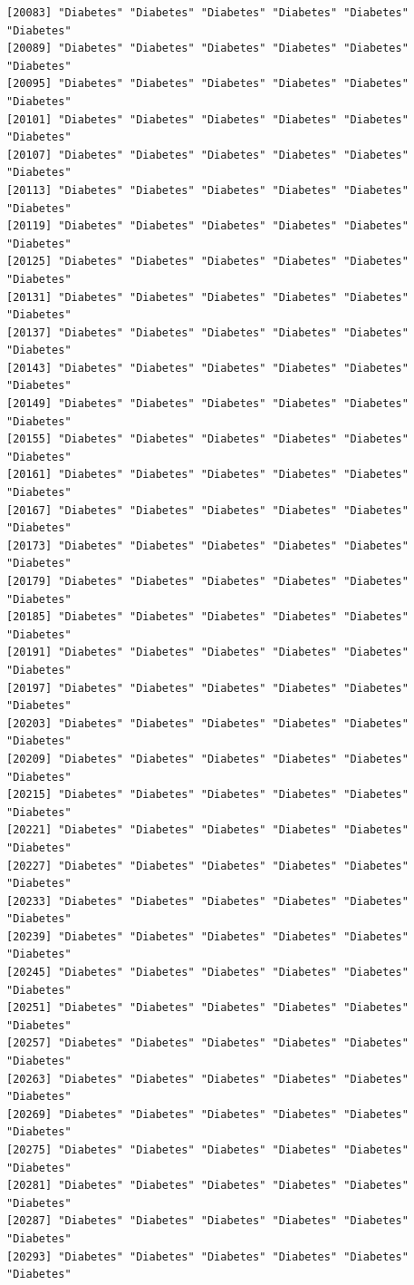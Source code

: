 \documentclass[
  letterpaper,
  DIV=11,
  numbers=noendperiod]{scrartcl}
\begin{document}
\begin{verbatim}
[20083] "Diabetes" "Diabetes" "Diabetes" "Diabetes" "Diabetes" "Diabetes"
[20089] "Diabetes" "Diabetes" "Diabetes" "Diabetes" "Diabetes" "Diabetes"
[20095] "Diabetes" "Diabetes" "Diabetes" "Diabetes" "Diabetes" "Diabetes"
[20101] "Diabetes" "Diabetes" "Diabetes" "Diabetes" "Diabetes" "Diabetes"
[20107] "Diabetes" "Diabetes" "Diabetes" "Diabetes" "Diabetes" "Diabetes"
[20113] "Diabetes" "Diabetes" "Diabetes" "Diabetes" "Diabetes" "Diabetes"
[20119] "Diabetes" "Diabetes" "Diabetes" "Diabetes" "Diabetes" "Diabetes"
[20125] "Diabetes" "Diabetes" "Diabetes" "Diabetes" "Diabetes" "Diabetes"
[20131] "Diabetes" "Diabetes" "Diabetes" "Diabetes" "Diabetes" "Diabetes"
[20137] "Diabetes" "Diabetes" "Diabetes" "Diabetes" "Diabetes" "Diabetes"
[20143] "Diabetes" "Diabetes" "Diabetes" "Diabetes" "Diabetes" "Diabetes"
[20149] "Diabetes" "Diabetes" "Diabetes" "Diabetes" "Diabetes" "Diabetes"
[20155] "Diabetes" "Diabetes" "Diabetes" "Diabetes" "Diabetes" "Diabetes"
[20161] "Diabetes" "Diabetes" "Diabetes" "Diabetes" "Diabetes" "Diabetes"
[20167] "Diabetes" "Diabetes" "Diabetes" "Diabetes" "Diabetes" "Diabetes"
[20173] "Diabetes" "Diabetes" "Diabetes" "Diabetes" "Diabetes" "Diabetes"
[20179] "Diabetes" "Diabetes" "Diabetes" "Diabetes" "Diabetes" "Diabetes"
[20185] "Diabetes" "Diabetes" "Diabetes" "Diabetes" "Diabetes" "Diabetes"
[20191] "Diabetes" "Diabetes" "Diabetes" "Diabetes" "Diabetes" "Diabetes"
[20197] "Diabetes" "Diabetes" "Diabetes" "Diabetes" "Diabetes" "Diabetes"
[20203] "Diabetes" "Diabetes" "Diabetes" "Diabetes" "Diabetes" "Diabetes"
[20209] "Diabetes" "Diabetes" "Diabetes" "Diabetes" "Diabetes" "Diabetes"
[20215] "Diabetes" "Diabetes" "Diabetes" "Diabetes" "Diabetes" "Diabetes"
[20221] "Diabetes" "Diabetes" "Diabetes" "Diabetes" "Diabetes" "Diabetes"
[20227] "Diabetes" "Diabetes" "Diabetes" "Diabetes" "Diabetes" "Diabetes"
[20233] "Diabetes" "Diabetes" "Diabetes" "Diabetes" "Diabetes" "Diabetes"
[20239] "Diabetes" "Diabetes" "Diabetes" "Diabetes" "Diabetes" "Diabetes"
[20245] "Diabetes" "Diabetes" "Diabetes" "Diabetes" "Diabetes" "Diabetes"
[20251] "Diabetes" "Diabetes" "Diabetes" "Diabetes" "Diabetes" "Diabetes"
[20257] "Diabetes" "Diabetes" "Diabetes" "Diabetes" "Diabetes" "Diabetes"
[20263] "Diabetes" "Diabetes" "Diabetes" "Diabetes" "Diabetes" "Diabetes"
[20269] "Diabetes" "Diabetes" "Diabetes" "Diabetes" "Diabetes" "Diabetes"
[20275] "Diabetes" "Diabetes" "Diabetes" "Diabetes" "Diabetes" "Diabetes"
[20281] "Diabetes" "Diabetes" "Diabetes" "Diabetes" "Diabetes" "Diabetes"
[20287] "Diabetes" "Diabetes" "Diabetes" "Diabetes" "Diabetes" "Diabetes"
[20293] "Diabetes" "Diabetes" "Diabetes" "Diabetes" "Diabetes" "Diabetes"

\end{verbatim}
\end{document}
